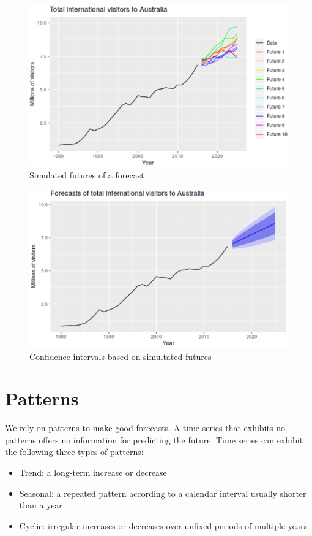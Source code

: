 \documentclass[
]{book}
\providecommand{\tightlist}{%
  \setlength{\itemsep}{0pt}\setlength{\parskip}{0pt}}
\begin{document}
\begin{figure}
\includegraphics[width=14.17in]{images/forecast_futures} \caption{Simulated futures of a forecast}\label{fig:futures}
\end{figure}

\begin{figure}
\includegraphics[width=13.99in]{images/forecast_ci} \caption{Confidence intervals based on simultated futures}\label{fig:ci}
\end{figure}

\hypertarget{patterns}{%
\section{Patterns}\label{patterns}}

We rely on patterns to make good forecasts. A time series that exhibits no patterns offers no information for predicting the future. Time series can exhibit the following three types of patterns:

\begin{itemize}
\tightlist
\item
  Trend: a long-term increase or decrease
\item
  Seasonal: a repeated pattern according to a calendar interval usually shorter than a year
\item
  Cyclic: irregular increases or decreases over unfixed periods of multiple years
\end{itemize}
\end{document}

